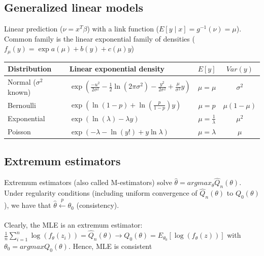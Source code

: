 \documentclass{article}
\begin{document}
\subsection{Generalized linear models}
Linear prediction ($\nu = x^T\beta$) with a link function ($E[y\mid x] = g^{-1}(\nu) = \mu$). Common family is the linear exponential family of densities ($f_\mu(y) = \exp{a(\mu) + b(y) + c(\mu)y}$)

\begin{table}[h]
  \begin{center}
  \begin{tabular}{llcc}
       \textbf{Distribution} & \textbf{Linear exponential density} & \textbf{$E[y]$} & \textbf{$Var(y)$}\\
       \midrule
      Normal ($\sigma^2$ known) & $\exp(\frac{-u^2}{2\sigma^2} - \frac{1}{2}\ln(2\pi\sigma^2) - \frac{y^2}{2\sigma^2} + \frac{\mu}{\sigma^2}y)$ & $\mu=\mu$ & $\sigma^2$\\
      Bernoulli & $\exp(\ln(1-p) + \ln(\frac{p}{1-p})y)$ & $\mu=p$ & $\mu(1-\mu)$\\
      Exponential & $\exp(\ln(\lambda) - \lambda y)$ & $\mu=\frac{1}{\lambda}$ & $\mu^2$\\
      Poisson & $\exp(-\lambda - \ln(y!) + y\ln\lambda)$ & $\mu=\lambda$ & $\mu$\\
      \bottomrule
  \end{tabular}
  \end{center}
\end{table}

\subsection{Extremum estimators}
Extremum estimators (also called M-estimators) solve $\hat{\theta} = argmax_\theta \hat{Q}_n(\theta)$. Under regularity conditions (including uniform convergence of $\hat{Q}_n(\theta)$ to $Q_0(\theta)$), we have that $\hat{\theta} \overset{p}{\longleftarrow} \theta_0$ (consistency). \\\\
Clearly, the MLE is an extremum estimator: $\frac{1}{n}\sum_{i=1}^n\log(f_\theta(z_i)) = \hat{Q}_n(\theta) \longrightarrow Q_0(\theta) = E_{\theta_0}[\log(f_\theta(z))]$ with $\theta_0 = argmax Q_0(\theta)$. Hence, MLE is consistent
\end{document}
